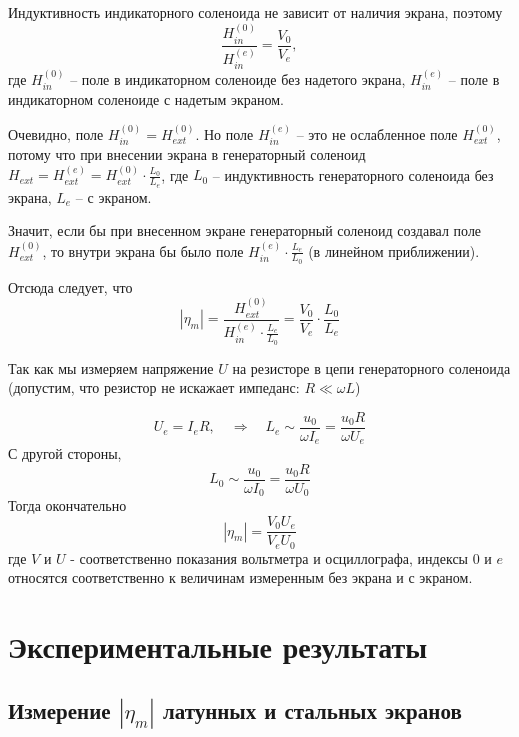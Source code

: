 \documentclass[a4paper,12pt]{article}
\begin{document}
Индуктивность индикаторного соленоида не зависит от наличия экрана, поэтому
\begin{equation}
	\frac{H_{in}^{(0)}}{H_{in}^{(e)}}=\frac{V_0}{V_e},
\end{equation}
где $H_{in}^{(0)}$ -- поле в индикаторном соленоиде без надетого экрана, $H_{in}^{(e)}$ -- поле в индикаторном соленоиде с надетым экраном.

Очевидно, поле $H_{in}^{(0)}=H_{ext}^{(0)}$. Но поле $H_{in}^{(e)}$ -- это не ослабленное поле $H_{ext}^{(0)}$, потому что при внесении экрана в генераторный соленоид $H_{ext}=H_{ext}^{(e)}=H_{ext}^{(0)}\cdot\frac{L_0}{L_e}$, где $L_0$ -- индуктивность генераторного соленоида без экрана, $L_e$ -- с экраном.

Значит, если бы при внесенном экране генераторный соленоид создавал поле $H_{ext}^{(0)}$, то внутри экрана бы было поле $H_{in}^{(e)}\cdot\frac{L_e}{L_0}$ (в линейном приближении).

Отсюда следует, что
\begin{equation}
	|\eta_m|=\frac{H_{ext}^{(0)}}{H_{in}^{(e)}\cdot\frac{L_e}{L_0}}=\frac{V_0}{V_e}\cdot\frac{L_0}{L_e}
\end{equation}

Так как мы измеряем напряжение $U$ на резисторе в цепи генераторного соленоида (допустим, что резистор не искажает импеданс: $R\ll \omega L$)

\begin{equation}
	U_e=I_eR, \quad\Rightarrow\quad L_e\sim \frac{u_0}{\omega I_e}=\frac{u_0 R}{\omega U_e}
\end{equation}
С другой стороны, 
\begin{equation}
	L_0\sim \frac{u_0}{\omega I_0} = \frac{u_0 R}{\omega U_0}
\end{equation}
Тогда окончательно
\begin{equation}
	|\eta_m|=\frac{V_0U_e}{V_eU_0}
\label{eq:7}
\end{equation}
где $V$ и $U$ - соответственно показания вольтметра и осциллографа, индексы $0$ и $e$ относятся соответственно к величинам измеренным без экрана и с экраном.


\newpage
\section{Экспериментальные результаты}
\subsection{Измерение $|\eta_m|$ латунных и стальных экранов}
\end{document}
